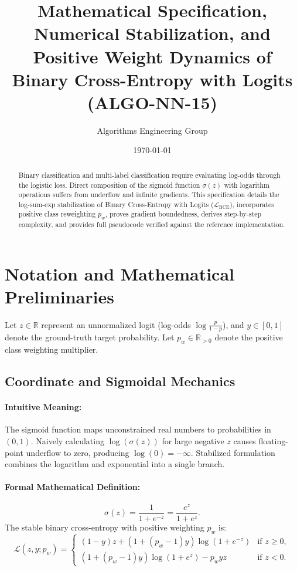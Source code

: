 \documentclass[11pt]{article}
\title{\textbf{Mathematical Specification, Numerical Stabilization, and Positive Weight Dynamics of Binary Cross-Entropy with Logits (ALGO-NN-15)}}
\author{Algorithms Engineering Group}
\date{\today}
\begin{document}
\maketitle

\begin{abstract}
Binary classification and multi-label classification require evaluating log-odds through the logistic loss. Direct composition of the sigmoid function $\sigma(z)$ with logarithm operations suffers from underflow and infinite gradients. This specification details the log-sum-exp stabilization of Binary Cross-Entropy with Logits ($\mathcal{L}_{\mathrm{BCE}}$), incorporates positive class reweighting $p_w$, proves gradient boundedness, derives step-by-step complexity, and provides full pseudocode verified against the reference implementation.
\end{abstract}

\section{Notation and Mathematical Preliminaries}
\label{sec:notation}

Let $z \in \mathbb{R}$ represent an unnormalized logit (log-odds $\log\frac{p}{1-p}$), and $y \in [0, 1]$ denote the ground-truth target probability. Let $p_w \in \mathbb{R}_{>0}$ denote the positive class weighting multiplier.

\subsection{Coordinate and Sigmoidal Mechanics}
\paragraph{Intuitive Meaning:} The sigmoid function maps unconstrained real numbers to probabilities in $(0, 1)$. Naively calculating $\log(\sigma(z))$ for large negative $z$ causes floating-point underflow to zero, producing $\log(0) = -\infty$. Stabilized formulation combines the logarithm and exponential into a single branch.

\paragraph{Formal Mathematical Definition:}
\begin{equation}
\sigma(z) = \frac{1}{1 + e^{-z}} = \frac{e^z}{1 + e^z}.
\end{equation}
The stable binary cross-entropy with positive weighting $p_w$ is:
\begin{equation}
\label{eq:bce_stable}
\mathcal{L}(z, y; p_w) = \begin{cases}
(1 - y) z + (1 + (p_w - 1)y) \log(1 + e^{-z}) & \text{if } z \ge 0, \\
(1 + (p_w - 1)y) \log(1 + e^z) - p_w y z & \text{if } z < 0.
\end{cases}
\end{equation}
\end{document}
